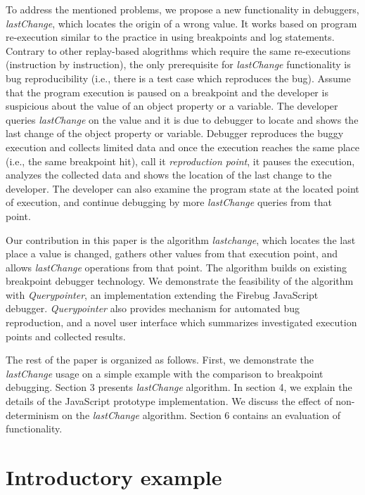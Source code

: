 \documentclass[preprint]{sigplanconf}
\begin{document}
To address the mentioned problems, we propose a new functionality in
debuggers, \textit{lastChange}, which locates the origin of a wrong
value. It works based on program re-execution similar to the practice
in using breakpoints and log statements. Contrary to other
replay-based alogrithms which require the same re-executions
(instruction by instruction), the only prerequisite for
\textit{lastChange} functionality is bug reproducibility (i.e., there
is a test case which reproduces the bug). Assume that the program
execution is paused on a breakpoint and the developer is suspicious
about the value of an object property or a variable. The developer
queries \textit{lastChange} on the value and it is due to debugger to
locate and shows the last change of the object property or
variable. Debugger reproduces the buggy execution and collects limited
data and once the execution reaches the same place (i.e., the same
breakpoint hit), call it \textit{reproduction point}, it pauses the
execution, analyzes the collected data and shows the location of the
last change to the developer. The developer can also examine the
program state at the located point of execution, and continue
debugging by more \textit{lastChange} queries from that point.

Our contribution in this paper is the algorithm \textit{lastchange},
which locates the last place a value is changed, gathers other values
from that execution point, and allows \textit{lastChange} operations
from that point. The algorithm builds on existing breakpoint debugger
technology. We demonstrate the feasibility of the algorithm with
\textit{Querypointer}, an implementation extending the Firebug
JavaScript debugger. \textit{Querypointer} also provides mechanism for
automated bug reproduction, and a novel user interface which
summarizes investigated execution points and collected results.

The rest of the paper is organized as follows. First, we demonstrate
the \textit{lastChange} usage on a simple example with the comparison
to breakpoint debugging. Section 3 presents \textit{lastChange}
algorithm. In section 4, we explain the details of the JavaScript
prototype implementation. We discuss the effect of non-determinism on
the \textit{lastChange} algorithm. Section 6 contains an evaluation of
 functionality.

\section{Introductory example}
\end{document}

